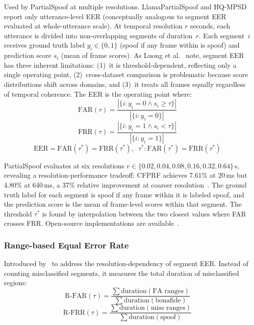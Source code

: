 \documentclass[journal]{IEEEtran}
\begin{document}
Used by PartialSpoof at multiple resolutions. LlamaPartialSpoof and HQ-MPSD report only utterance-level EER (conceptually analogous to segment EER evaluated at whole-utterance scale). At temporal resolution $r$ seconds, each utterance is divided into non-overlapping segments of duration~$r$. Each segment~$i$ receives ground truth label $y_i \in \{0,1\}$ (spoof if any frame within is spoof) and prediction score $s_i$ (mean of frame scores). As Luong et al.~\cite{luong2025metrics} note, segment EER has three inherent limitations: (1)~it is threshold-dependent, reflecting only a single operating point, (2)~cross-dataset comparison is problematic because score distributions shift across domains, and (3)~it treats all frames equally regardless of temporal coherence. The EER is the operating point where:
\begin{equation}
\label{eq:far}
\text{FAR}(\tau) = \frac{|\{i : y_i = 0 \wedge s_i \geq \tau\}|}{|\{i : y_i = 0\}|}
\end{equation}
\begin{equation}
\label{eq:frr}
\text{FRR}(\tau) = \frac{|\{i : y_i = 1 \wedge s_i < \tau\}|}{|\{i : y_i = 1\}|}
\end{equation}
\begin{equation}
\label{eq:eer}
\text{EER} = \text{FAR}(\tau^*) = \text{FRR}(\tau^*), \;\; \tau^* \!: \text{FAR}(\tau^*) = \text{FRR}(\tau^*)
\end{equation}

PartialSpoof evaluates at six resolutions $r \in \{0.02, 0.04, 0.08, 0.16, 0.32, 0.64\}$\,s, revealing a resolution-performance tradeoff: CFPRF achieves 7.61\% at 20\,ms but 4.80\% at 640\,ms, a 37\% relative improvement at coarser resolution~\cite{luong2025metrics}. The ground truth label for each segment is spoof if any frame within it is labeled spoof, and the prediction score is the mean of frame-level scores within that segment. The threshold $\tau^*$ is found by interpolation between the two closest values where FAR crosses FRR. Open-source implementations are available~\cite{luong2025metrics}.

\subsubsection{Range-based Equal Error Rate}

Introduced by~\cite{zhang2023rangeeer} to address the resolution-dependency of segment EER. Instead of counting misclassified segments, it measures the total duration of misclassified regions:
\begin{equation}
\label{eq:rfar}
\text{R-FAR}(\tau) = \frac{\sum \text{duration}(\text{FA ranges})}{\sum \text{duration}(\text{bonafide})}
\end{equation}
\begin{equation}
\label{eq:rfrr}
\text{R-FRR}(\tau) = \frac{\sum \text{duration}(\text{miss ranges})}{\sum \text{duration}(\text{spoof})}
\end{equation}
\end{document}
